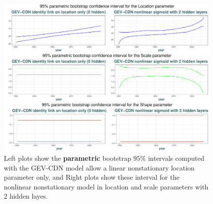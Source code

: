   \begin{figure}[!htb]
  	\centering	\includegraphics[width=1.01\linewidth]{g_boot_par.pdf}\caption{Left plots show the \textbf{parametric} bootstrap $95\%$ intervals computed with the GEV-CDN model allow a linear nonstationary location parameter only, and Right plots show these interval for the nonlinear nonstationary model in location and scale parameters with 2 hidden layes. }\label{fig:boot_par}
  \end{figure}

